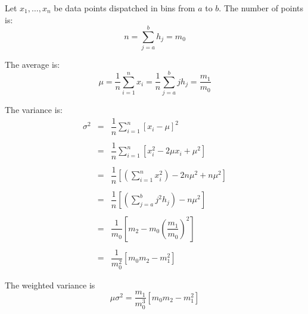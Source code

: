 \documentclass[aps]{revtex4}
\begin{document}
Let $x_1,\ldots,x_n$ be data points dispatched in bins from $a$ to $b$.
The number of points is:
\begin{equation}
	n = \sum_{j=a}^b h_j = m_0
\end{equation}

The average is:
\begin{equation}
	\mu = \dfrac{1}{n} \sum_{i=1}^n x_i = \dfrac{1}{n} \sum_{j=a}^b j h_j = \frac{m_1}{m_0}
\end{equation}

The variance is:
\begin{equation}
	\begin{array}{rcl}
	\sigma^2 & = & \displaystyle \dfrac{1}{n} \sum_{i=1}^n \left[x_i - \mu \right]^2 \\
	\\
	 & = & \displaystyle \dfrac{1}{n}  \sum_{i=1}^n \left[x_i^2 - 2\mu x_i + \mu^2 \right] \\
	 \\
	 & = & \displaystyle \dfrac{1}{n} \left[ \left(\sum_{i=1}^n x_i^2 \right) - 2 n \mu^2 + n \mu^2  \right]\\
	 \\
	 & = & \displaystyle \dfrac{1}{n} \left[ \left(\sum_{j=a}^b j^2 h_j  \right) - n \mu^2\right]\\
	 \\
	 & = & \dfrac{1}{m_0} \left[ m_2 - m_0 \left(\dfrac{m_1}{m_0}\right)^2 \right]\\
	 \\
	 & = & \dfrac{1}{m_0^2} \left[ m_0 m_2 - m_1^2 \right]
	\end{array}
\end{equation}

The weighted variance is
\begin{equation}
	\mu \sigma^2 = \dfrac{m_1}{m_0^3} \left[ m_0 m_2 - m_1^2 \right]
\end{equation}
\end{document}
